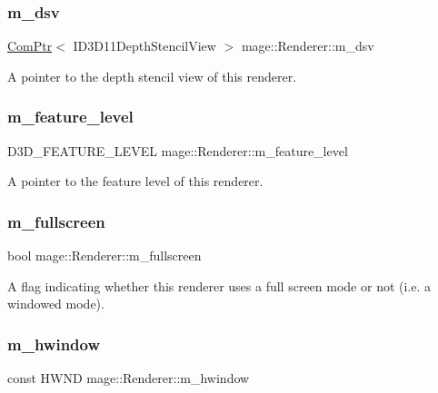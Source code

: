 \subsubsection{\texorpdfstring{m\+\_\+dsv}{m\_dsv}}
{\footnotesize\ttfamily \hyperlink{namespacemage_ae74f374780900893caa5555d1031fd79}{Com\+Ptr}$<$ I\+D3\+D11\+Depth\+Stencil\+View $>$ mage\+::\+Renderer\+::m\+\_\+dsv\hspace{0.3cm}{\ttfamily [private]}}

A pointer to the depth stencil view of this renderer. \hypertarget{classmage_1_1_renderer_aa97b108ef58f7d41ddb527f6ba2bfdf9}{}\label{classmage_1_1_renderer_aa97b108ef58f7d41ddb527f6ba2bfdf9} 
\subsubsection{\texorpdfstring{m\+\_\+feature\+\_\+level}{m\_feature\_level}}
{\footnotesize\ttfamily D3\+D\+\_\+\+F\+E\+A\+T\+U\+R\+E\+\_\+\+L\+E\+V\+EL mage\+::\+Renderer\+::m\+\_\+feature\+\_\+level\hspace{0.3cm}{\ttfamily [private]}}

A pointer to the feature level of this renderer. \hypertarget{classmage_1_1_renderer_a72bb88b17491bd388460afae9d207b0a}{}\label{classmage_1_1_renderer_a72bb88b17491bd388460afae9d207b0a} 
\subsubsection{\texorpdfstring{m\+\_\+fullscreen}{m\_fullscreen}}
{\footnotesize\ttfamily bool mage\+::\+Renderer\+::m\+\_\+fullscreen\hspace{0.3cm}{\ttfamily [private]}}

A flag indicating whether this renderer uses a full screen mode or not (i.\+e. a windowed mode). \hypertarget{classmage_1_1_renderer_adadc1028e5ad6551abbecfd8529e4aa1}{}\label{classmage_1_1_renderer_adadc1028e5ad6551abbecfd8529e4aa1} 
\subsubsection{\texorpdfstring{m\+\_\+hwindow}{m\_hwindow}}
{\footnotesize\ttfamily const H\+W\+ND mage\+::\+Renderer\+::m\+\_\+hwindow\hspace{0.3cm}{\ttfamily [private]}}

